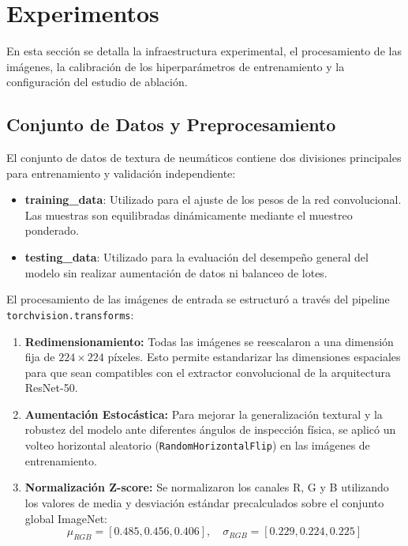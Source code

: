 \section{Experimentos}
En esta sección se detalla la infraestructura experimental, el procesamiento de las imágenes, la calibración de los hiperparámetros de entrenamiento y la configuración del estudio de ablación.

\subsection{Conjunto de Datos y Preprocesamiento}
El conjunto de datos de textura de neumáticos contiene dos divisiones principales para entrenamiento y validación independiente:
\begin{itemize}
    \item \textbf{training\_data}: Utilizado para el ajuste de los pesos de la red convolucional. Las muestras son equilibradas dinámicamente mediante el muestreo ponderado.
    \item \textbf{testing\_data}: Utilizado para la evaluación del desempeño general del modelo sin realizar aumentación de datos ni balanceo de lotes.
\end{itemize}

El procesamiento de las imágenes de entrada se estructuró a través del pipeline \texttt{torchvision.transforms}:
\begin{enumerate}
    \item \textbf{Redimensionamiento:} Todas las imágenes se reescalaron a una dimensión fija de $224 \times 224$ píxeles. Esto permite estandarizar las dimensiones espaciales para que sean compatibles con el extractor convolucional de la arquitectura ResNet-50.
    \item \textbf{Aumentación Estocástica:} Para mejorar la generalización textural y la robustez del modelo ante diferentes ángulos de inspección física, se aplicó un volteo horizontal aleatorio (\texttt{RandomHorizontalFlip}) en las imágenes de entrenamiento.
    \item \textbf{Normalización Z-score:} Se normalizaron los canales R, G y B utilizando los valores de media y desviación estándar precalculados sobre el conjunto global ImageNet:
    \[
    \mu_{RGB} = [0.485, 0.456, 0.406], \quad \sigma_{RGB} = [0.229, 0.224, 0.225]
    \]
\end{enumerate}

